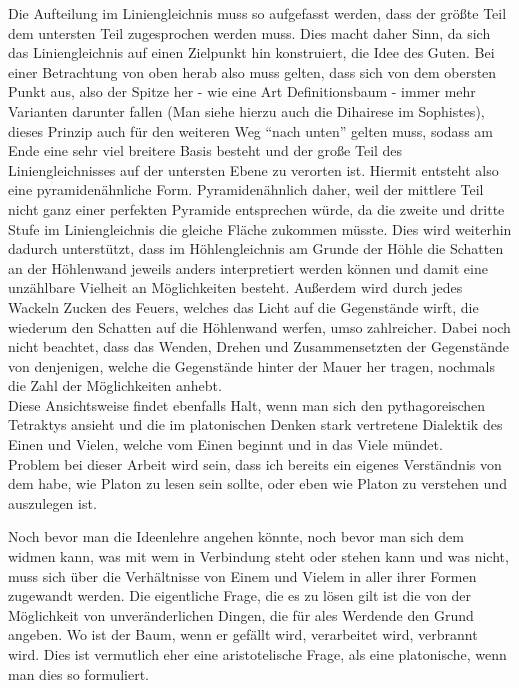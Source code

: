 \documentclass[12pt]{article}
\begin{document}
Die Aufteilung im Liniengleichnis muss so aufgefasst werden, dass der größte Teil dem untersten Teil zugesprochen werden muss. Dies macht daher Sinn, da sich das Liniengleichnis auf einen Zielpunkt hin konstruiert, die Idee des Guten. Bei einer Betrachtung von oben herab also muss gelten, dass sich von dem obersten Punkt aus, also der Spitze her - wie eine Art Definitionsbaum - immer mehr Varianten darunter fallen (Man siehe hierzu auch die Dihairese im Sophistes), dieses Prinzip auch für den weiteren Weg \enquote{nach unten} gelten muss, sodass am Ende eine sehr viel breitere Basis besteht und der große Teil des Liniengleichnisses auf der untersten Ebene zu verorten ist. Hiermit entsteht also eine pyramidenähnliche Form. Pyramidenähnlich daher, weil der mittlere Teil nicht ganz einer perfekten Pyramide entsprechen würde, da die zweite und dritte Stufe im Liniengleichnis die gleiche Fläche zukommen müsste. Dies wird weiterhin dadurch unterstützt, dass im Höhlengleichnis am Grunde der Höhle die Schatten an der Höhlenwand jeweils anders interpretiert werden können und damit eine unzählbare Vielheit an Möglichkeiten besteht. Außerdem wird durch jedes Wackeln Zucken des Feuers, welches das Licht auf die Gegenstände wirft, die wiederum den Schatten auf die Höhlenwand werfen, umso zahlreicher. Dabei noch nicht beachtet, dass das Wenden, Drehen und Zusammensetzten der Gegenstände von denjenigen, welche die Gegenstände hinter der Mauer her tragen, nochmals die Zahl der Möglichkeiten anhebt.\\
Diese Ansichtsweise findet ebenfalls Halt, wenn man sich den pythagoreischen Tetraktys ansieht und die im platonischen Denken stark vertretene Dialektik des Einen und Vielen, welche vom Einen beginnt und in das Viele mündet.\\
Problem bei dieser Arbeit wird sein, dass ich bereits ein eigenes Verständnis von dem habe, wie Platon zu lesen sein sollte, oder eben wie Platon zu verstehen und auszulegen ist. 

Noch bevor man die Ideenlehre angehen könnte, noch bevor man sich dem widmen kann, was mit wem in Verbindung steht oder stehen kann und was nicht, muss sich über die Verhältnisse von Einem und Vielem in aller ihrer Formen zugewandt werden.
Die eigentliche Frage, die es zu lösen gilt ist die von der Möglichkeit von unveränderlichen Dingen, die für ales Werdende den Grund angeben. Wo ist der Baum, wenn er gefällt wird, verarbeitet wird, verbrannt wird. Dies ist vermutlich eher eine aristotelische Frage, als eine platonische, wenn man dies so formuliert.
\end{document}
